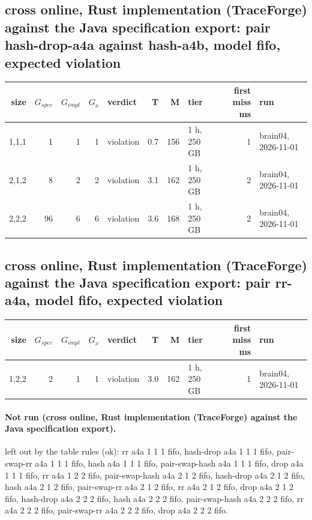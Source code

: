 \documentclass[10pt]{article}
\begin{document}
\subsection*{cross online, Rust implementation (TraceForge) against the Java specification export: pair \textsf{hash-drop-a4a} against \textsf{hash-a4b}, model fifo, expected violation}
\begin{longtable}{@{}rrrrlrrlrl@{}}
\toprule
size & $G_{\mathit{spec}}$ & $G_{\mathit{impl}}$ & $G_x$ & verdict & T & M & tier & first miss ms & run \\
\midrule
\endhead
\color{red} 1,1,1 & 1 & 1 & 1 & violation & 0.7 & 156 & 1 h, 250 GB & 1 & brain04, 2026-11-01 \\
\color{red} 2,1,2 & 8 & 2 & 2 & violation & 3.1 & 162 & 1 h, 250 GB & 2 & brain04, 2026-11-01 \\
\color{red} 2,2,2 & 96 & 6 & 6 & violation & 3.6 & 168 & 1 h, 250 GB & 2 & brain04, 2026-11-01 \\
\bottomrule
\end{longtable}
\subsection*{cross online, Rust implementation (TraceForge) against the Java specification export: pair \textsf{rr-a4a}, model fifo, expected violation}
\begin{longtable}{@{}rrrrlrrlrl@{}}
\toprule
size & $G_{\mathit{spec}}$ & $G_{\mathit{impl}}$ & $G_x$ & verdict & T & M & tier & first miss ms & run \\
\midrule
\endhead
\color{red} 1,2,2 & 2 & 1 & 1 & violation & 3.0 & 162 & 1 h, 250 GB & 1 & brain04, 2026-11-01 \\
\bottomrule
\end{longtable}
\paragraph{Not run (cross online, Rust implementation (TraceForge) against the Java specification export).}
left out by the table rules (ok): rr a4a 1 1 1 fifo, hash-drop a4a 1 1 1 fifo, pair-swap-rr a4a 1 1 1 fifo, hash a4a 1 1 1 fifo, pair-swap-hash a4a 1 1 1 fifo, drop a4a 1 1 1 fifo, rr a4a 1 2 2 fifo, pair-swap-hash a4a 2 1 2 fifo, hash-drop a4a 2 1 2 fifo, hash a4a 2 1 2 fifo, pair-swap-rr a4a 2 1 2 fifo, rr a4a 2 1 2 fifo, drop a4a 2 1 2 fifo, hash-drop a4a 2 2 2 fifo, hash a4a 2 2 2 fifo, pair-swap-hash a4a 2 2 2 fifo, rr a4a 2 2 2 fifo, pair-swap-rr a4a 2 2 2 fifo, drop a4a 2 2 2 fifo.\par
\end{document}
